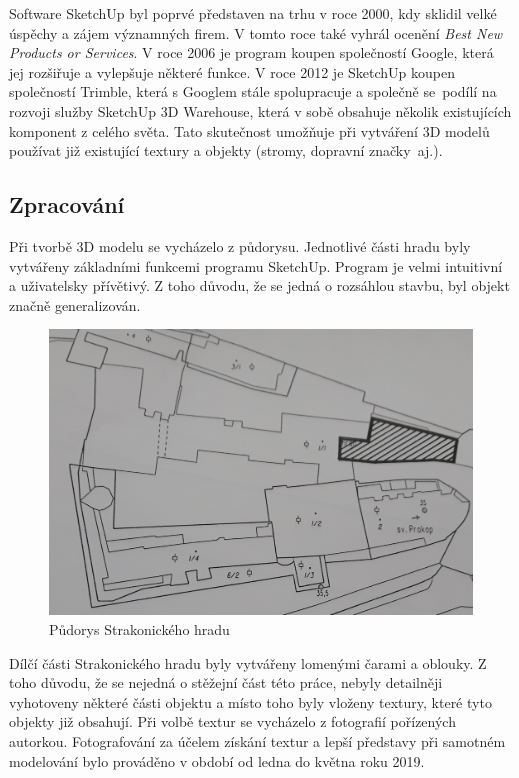 \documentclass[thesis=M,czech]{FITthesis}[2012/06/26]
\begin{document}
Software SketchUp byl poprvé představen na trhu v roce 2000, kdy sklidil velké úspěchy a zájem významných firem. V tomto roce také vyhrál ocenění \textit{Best New Products or Services}. V roce 2006 je program koupen společností Google, která jej rozšiřuje a vylepšuje některé funkce. V roce 2012 je SketchUp koupen společností Trimble, která s Googlem stále spolupracuje a společně se~podílí na rozvoji služby SketchUp 3D Warehouse, která v sobě obsahuje několik existujících komponent z celého světa. Tato skutečnost umožňuje při vytváření 3D modelů používat již existující textury a objekty (stromy, dopravní značky~aj.). \cite{sketchup1} \cite{sketchup2}

\subsection{Zpracování}
Při tvorbě 3D modelu se vycházelo z půdorysu. Jednotlivé části hradu byly vytvářeny základními funkcemi programu SketchUp. Program je velmi intuitivní a uživatelsky přívětivý. Z toho důvodu, že se jedná o rozsáhlou stavbu, byl objekt značně generalizován. 

\begin{figure}[h]
	\centering
	\includegraphics[width=13cm]{pics/pudorys_hrad.jpg}
	\caption{Půdorys Strakonického hradu}
	\label{obrazek:pudorys}
\end{figure}

Dílčí části Strakonického hradu byly vytvářeny lomenými čarami a oblouky. Z toho důvodu, že se nejedná o stěžejní část této práce, nebyly detailněji vyhotoveny některé části objektu a místo toho byly vloženy textury, které tyto objekty již obsahují. Při volbě textur se vycházelo z fotografií pořízených autorkou. Fotografování za účelem získání textur a lepší představy při samotném modelování bylo prováděno v období od ledna do května roku 2019. 
\end{document}
